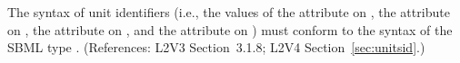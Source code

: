 The syntax of unit identifiers (i.e., the values of the 
attribute on \UnitDefinition, the  attribute on \Compartment,
the  attribute on \Parameter, and the 
attribute on \Species) must conform to the syntax of the SBML type
.  (References: L2V3 Section~3.1.8; L2V4 Section~\ref{sec:unitsid}.)
